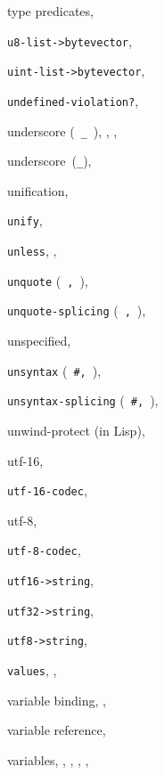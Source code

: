 {\begin{multicols}{2}
type predicates, \pageref{start_s117}
  
\texttt{u8-list-\textgreater{}bytevector}, \textit{\pageref{objects_s253}}
  
\texttt{uint-list-\textgreater{}bytevector}, \textit{\pageref{objects_s261}}
  
\texttt{undefined-violation?}, \textit{\pageref{exceptions_s31}}
  
underscore ( \texttt{\_{}} ), \pageref{further_s17}, \pageref{syntax_s24}, \pageref{syntax_s58}
  
underscore (\texttt{\_{}}), \pageref{syntax_s19}
  
unification, \pageref{examples_s76}
  
\texttt{unify}, \pageref{examples_s78}
  
\texttt{unless}, \pageref{further_s31}, \textit{\pageref{control_s17}}
  
\texttt{unquote} ( \texttt{,} ), \textit{\pageref{objects_s5}}
  
\texttt{unquote-splicing} ( \texttt{,\@{}} ), \textit{\pageref{objects_s5}}
  
unspecified, \pageref{intro_s53}
  
\texttt{unsyntax} ( \texttt{\#{},} ), \textit{\pageref{syntax_s40}}
  
\texttt{unsyntax-splicing} ( \texttt{\#{},\@{}} ), \textit{\pageref{syntax_s40}}
  
unwind-protect (in Lisp), \pageref{control_s59}
  
utf-16, \pageref{io_s13}
  
\texttt{utf-16-codec}, \textit{\pageref{io_s22}}
  
utf-8, \pageref{io_s12}
  
\texttt{utf-8-codec}, \textit{\pageref{io_s22}}
  
\texttt{utf16-\textgreater{}string}, \textit{\pageref{io_s96}}
  
\texttt{utf32-\textgreater{}string}, \textit{\pageref{io_s96}}
  
\texttt{utf8-\textgreater{}string}, \textit{\pageref{io_s95}}
  
\texttt{values}, \pageref{control_s68}, \textit{\pageref{control_s70}}
  
variable binding, \pageref{start_s52}, \pageref{binding_s0}
  
variable reference, \textit{\pageref{binding_s2}}
  
variables, \pageref{intro_s10}, \pageref{start_s18}, \pageref{start_s50}, \pageref{start_s77}, \pageref{start_s164}
  

\end{multicols}}

